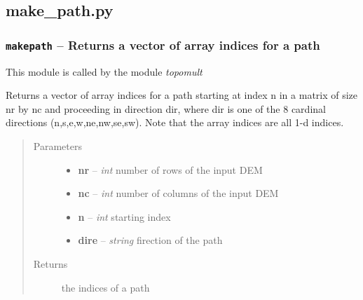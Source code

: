 \documentclass[letterpaper,10pt,english]{sphinxmanual}
\begin{document}
\subsection{make\_path.py}
\label{docs/topographic:make-path-py}\label{docs/topographic:module-make_path}

\subsubsection{\texttt{makepath} -- Returns a vector of array indices for a path}
\label{docs/topographic:makepath-returns-a-vector-of-array-indices-for-a-path}
This module is called by the module \emph{topomult}


\begin{fulllineitems}
\label{docs/topographic:make_path.make_path}
Returns a vector of array indices for a path starting at index n in a
matrix of size nr by nc and proceeding in direction dir, where dir is one
of the 8 cardinal directions (n,s,e,w,ne,nw,se,sw).
Note that the array indices are all 1-d indices.
\begin{quote}\begin{description}
\item[{Parameters}] \leavevmode\begin{itemize}
\item {} 
\textbf{nr} -- \emph{int} number of rows of the input DEM

\item {} 
\textbf{nc} -- \emph{int} number of columns of the input DEM

\item {} 
\textbf{n} -- \emph{int} starting index

\item {} 
\textbf{dire} -- \emph{string} firection of the path

\end{itemize}

\item[{Returns }] \leavevmode
{} the indices of a path

\end{description}\end{quote}

\end{fulllineitems}
\end{document}
